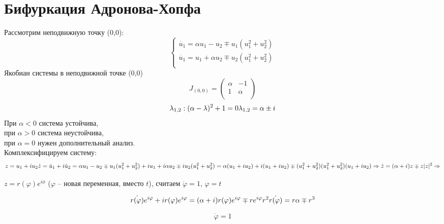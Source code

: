 
\section{Бифуркация Адронова-Хопфа}	
Рассмотрим неподвижную точку (0,0):
\[
	\begin{cases}
	\dot{u_1} = \alpha u_1 - u_2 \mp u_1 (u_1^2 + u_2^2)\\
	\dot{u_1} = u_1 + \alpha u_2 \mp u_2 (u_1^2 + u_2^2)\\
		\end{cases}
\]
Якобиан системы в неподвижной точке (0,0)
\[
	J_{(0,0)} = 
	\left(
	\begin{matrix}
	\alpha & -1 \\
	1 & \alpha \\
	\end{matrix}
	\right)
\]
$$ \lambda_{1,2}: (\alpha - \lambda)^2+1=0 \\
\lambda_{1,2} = \alpha \pm i
$$	
При $\alpha < 0 $ система устойчива, \\
при $\alpha > 0 $ система неустойчива, \\
при $\alpha = 0 $ нужен дополнительный анализ.\\
Комплексифицируем систему:
\[
 z = u_1 + iu_2
 \dot{z} = \dot{u}_1+i\dot{u}_2 = \alpha u_1 - u_2 \mp u_1 (u_1^2 + u_2^2) + i u_1 + i \alpha u_2 \mp i u_2 (u_1^2 + u_2^2) = \alpha (u_1 + i u_2) + i (u_1 + i u_2) \mp (u_1^2 + u_2^2)(u_1^2 + u_2^2)(u_1 + iu_2) \Rightarrow \\
 \dot{z} = (\alpha + i)z \mp z|z|^2 \Rightarrow 
\]

$ z = r(\varphi) e^{i \phi}$ ($\varphi$ -- новая переменная, вместо $t$), считаем $\dot{\varphi} = 1, \, \varphi = t $

$$
\dot{r(\varphi)} e^{i \varphi} + ir(\varphi) e^{i \varphi} = (\alpha + i) r(\varphi)e^{i \varphi} \mp r e^{i \varphi} r^2 \\
\dot{r(\varphi)} = r \alpha \mp r^3 \\
$$

$$
\dot{\varphi} = 1
$$

